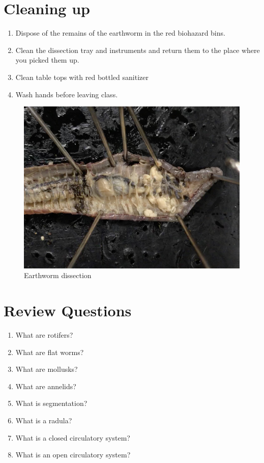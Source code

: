 \section{Cleaning up}\label{cleaning-up-1}

\begin{enumerate}
\def\labelenumi{\arabic{enumi}.}
\tightlist
\item
  Dispose of the remains of the earthworm in the red biohazard bins.
\item
  Clean the dissection tray and instruments and return them to the place
  where you picked them up.
\item
  Clean table tops with red bottled sanitizer
\item
  Wash hands before leaving class.
\end{enumerate}

\begin{figure}

{\centering \includegraphics[width=0.7\linewidth]{./figures/rotifera/earthworm}

}

\caption{Earthworm dissection}\label{fig:earthworm}
\end{figure}

\section{Review Questions}\label{review-questions-4}

\begin{enumerate}
\def\labelenumi{\arabic{enumi}.}
\tightlist
\item
  What are rotifers?
\item
  What are flat worms?
\item
  What are mollusks?
\item
  What are annelids?
\item
  What is segmentation?
\item
  What is a radula?
\item
  What is a closed circulatory system?
\item
  What is an open circulatory system?
\end{enumerate}

